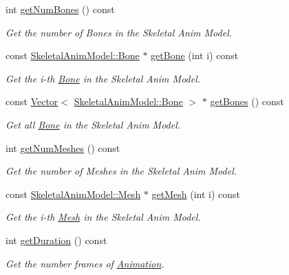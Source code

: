 \begin{DoxyCompactItemize}
int \hyperlink{class_magnum_1_1_skeletal_anim_model_ab140f884295232d5723274752006ba53}{get\+Num\+Bones} () const 
\begin{DoxyCompactList}\small\item\em Get the number of Bones in the Skeletal Anim Model. \end{DoxyCompactList}\item 
const \hyperlink{class_magnum_1_1_skeletal_anim_model_1_1_bone}{Skeletal\+Anim\+Model\+::\+Bone} $\ast$ \hyperlink{class_magnum_1_1_skeletal_anim_model_a866c8a140763de07aaeb01e7fac0b783}{get\+Bone} (int i) const 
\begin{DoxyCompactList}\small\item\em Get the i-\/th \hyperlink{class_magnum_1_1_skeletal_anim_model_1_1_bone}{Bone} in the Skeletal Anim Model. \end{DoxyCompactList}\item 
const \hyperlink{class_magnum_1_1_vector}{Vector}$<$ \hyperlink{class_magnum_1_1_skeletal_anim_model_1_1_bone}{Skeletal\+Anim\+Model\+::\+Bone} $>$ $\ast$ \hyperlink{class_magnum_1_1_skeletal_anim_model_a2764bd0cf99f42e55725612a559337f2}{get\+Bones} () const 
\begin{DoxyCompactList}\small\item\em Get all \hyperlink{class_magnum_1_1_skeletal_anim_model_1_1_bone}{Bone} in the Skeletal Anim Model. \end{DoxyCompactList}\item 
int \hyperlink{class_magnum_1_1_skeletal_anim_model_a125059deefe994f0756bfe5bbc46cfe3}{get\+Num\+Meshes} () const 
\begin{DoxyCompactList}\small\item\em Get the number of Meshes in the Skeletal Anim Model. \end{DoxyCompactList}\item 
const \hyperlink{class_magnum_1_1_skeletal_anim_model_1_1_mesh}{Skeletal\+Anim\+Model\+::\+Mesh} $\ast$ \hyperlink{class_magnum_1_1_skeletal_anim_model_afb7a254923080709050676115f23998f}{get\+Mesh} (int i) const 
\begin{DoxyCompactList}\small\item\em Get the i-\/th \hyperlink{class_magnum_1_1_skeletal_anim_model_1_1_mesh}{Mesh} in the Skeletal Anim Model. \end{DoxyCompactList}\item 
int \hyperlink{class_magnum_1_1_skeletal_anim_model_a8db5a897c22103c7100adbb673d53b37}{get\+Duration} () const 
\begin{DoxyCompactList}\small\item\em Get the number frames of \hyperlink{class_magnum_1_1_skeletal_anim_model_1_1_animation}{Animation}. \end{DoxyCompactList}\item 

\end{DoxyCompactItemize}
